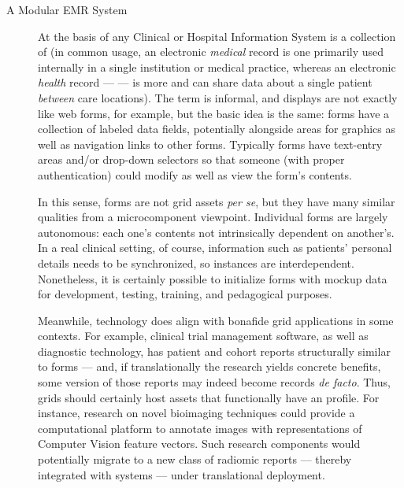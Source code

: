 \documentclass[11pt]{article}
\begin{document}
\begin{description}

\item[A Modular EMR System]  At the basis of any Clinical or Hospital Information 
System is a collection of \EMR{}  (in common usage, an 
electronic \textit{medical} record is one primarily used internally 
in a single institution or medical practice, whereas an electronic 
\textit{health} record --- \EHR{} --- is more  
and can share data about a single patient \textit{between} care 
locations).  The term  is informal, and \EMR{} displays 
are not exactly like web forms, for example, but the 
basic idea is the same: forms have a collection of labeled 
data fields, potentially alongside areas for graphics as well 
as navigation links to other forms.  Typically forms have 
text-entry areas and/or drop-down selectors so that 
someone (with proper authentication) could modify as well as 
view the form's contents.

\pseudoIndent{} In this sense, \GUI{} forms are not grid assets \textit{per se}, 
but they have many similar qualities from a microcomponent 
viewpoint.  Individual forms are largely autonomous: each 
one's contents not intrinsically dependent on another's.  
In a real clinical setting, of course, information such as 
patients' personal details needs to be synchronized, so \EMR{} instances  
are interdependent.  Nonetheless, it is certainly possible to initialize forms 
with mockup data for development, testing, training, and pedagogical purposes.

\pseudoIndent{} Meanwhile, \EMR{} technology does align with bonafide grid 
applications in some contexts.  For example, clinical 
trial management software, as well as diagnostic technology, 
has patient and cohort reports structurally 
similar to \EMR{} forms --- and, if translationally the 
research yields concrete benefits, some version 
of those reports may indeed become \EMR{} records 
\textit{de facto}.  Thus, \FAIR{} grids should certainly 
host assets that functionally have an \EMR{} profile.  
For instance, research on novel bioimaging techniques 
could provide a computational platform to annotate 
images with representations of Computer Vision feature 
vectors.  Such research components would potentially 
migrate to a new class of radiomic reports 
--- thereby integrated with \EMR{} systems --- under 
translational deployment.     

\end{description}
\end{document}
